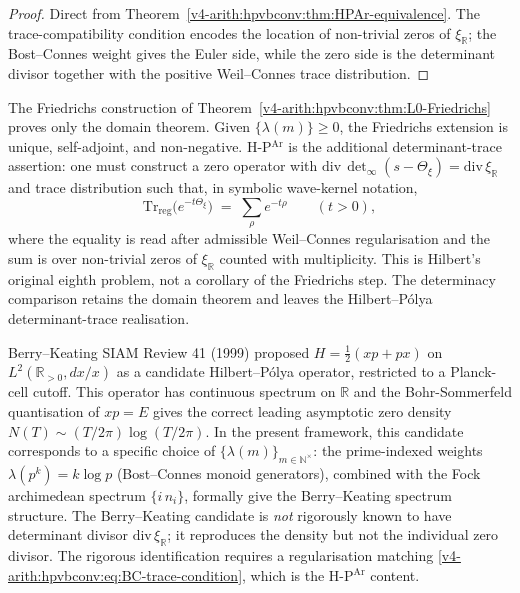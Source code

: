 \begin{proof}
Direct from Theorem~\ref{v4-arith:hpvbconv:thm:HPAr-equivalence}. The
trace-compatibility condition encodes the location of non-trivial
zeros of \(\xi_{\mathbb R}\); the Bost--Connes weight gives the Euler
side, while the zero side is the determinant divisor together with the
positive Weil--Connes trace distribution.
\end{proof}

\begin{remark}
\label{v4-arith:hpvbconv:rem:hilbert-polya-content}
The Friedrichs construction of
Theorem~\ref{v4-arith:hpvbconv:thm:L0-Friedrichs} proves only the domain
theorem. Given \(\{\lambda(m)\}\geq 0\), the Friedrichs extension is
unique, self-adjoint, and non-negative. H-P\(^{\mathrm{Ar}}\) is the
additional determinant-trace assertion: one must construct a zero
operator with
\(\mathrm{div}\,\det_{\infty}(s-\Theta_{\xi})
=\mathrm{div}\,\xi_{\mathbb R}\) and trace distribution such that, in
symbolic wave-kernel notation,
\begin{equation*}
\mathrm{Tr}_{\mathrm{reg}}\bigl(e^{-t\Theta_{\xi}}\bigr)\;=\;\sum_{\rho}e^{-t\rho}\qquad(t>0),
\end{equation*}
where the equality is read after admissible Weil--Connes
regularisation and the sum is over non-trivial zeros of
\(\xi_{\mathbb R}\) counted with multiplicity. This is Hilbert's
original eighth problem, not a corollary of the Friedrichs step. The
determinacy comparison retains the domain theorem and leaves the
Hilbert--P\'olya determinant-trace realisation.
\end{remark}

\begin{remark}
\label{v4-arith:hpvbconv:rem:berry-keating}
Berry--Keating SIAM Review 41 (1999) proposed
\(H=\tfrac{1}{2}(xp+px)\) on \(L^{2}(\mathbb{R}_{>0},dx/x)\) as a candidate
Hilbert--P\'olya operator, restricted to a Planck-cell cutoff. This
operator has continuous spectrum on \(\mathbb{R}\) and the Bohr-Sommerfeld
quantisation of \(xp=E\) gives the correct leading asymptotic zero
density \(N(T)\sim (T/2\pi)\log(T/2\pi)\). In the present framework,
this candidate corresponds to a specific choice of
\(\{\lambda(m)\}_{m\in\mathbb{N}^{\times}}\): the prime-indexed weights
\(\lambda(p^{k})=k\log p\) (Bost--Connes monoid generators), combined
with the Fock archimedean spectrum \(\{i\,n_{i}\}\), formally give the
Berry--Keating spectrum structure. The Berry--Keating candidate is
\emph{not} rigorously known to have determinant divisor
\(\mathrm{div}\,\xi_{\mathbb R}\); it reproduces the density but not
the individual zero divisor. The rigorous
identification requires a regularisation matching
\eqref{v4-arith:hpvbconv:eq:BC-trace-condition}, which is the
H-P\(^{\mathrm{Ar}}\) content.
\end{remark}

